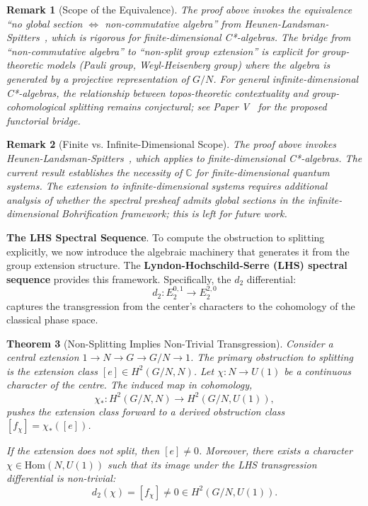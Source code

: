 \documentclass[11pt]{article}
\newtheorem{theorem}{Theorem}[section]
\newtheorem{remark}[theorem]{Remark}
\begin{document}
\begin{remark}[Scope of the Equivalence]
The proof above invokes the equivalence ``no global section $\Leftrightarrow$ non-commutative algebra'' from Heunen-Landsman-Spitters~\cite[Theorem 5.3]{Heunen2012}, which is rigorous for finite-dimensional C*-algebras. The bridge from ``non-commutative algebra'' to ``non-split group extension'' is explicit for group-theoretic models (Pauli group, Weyl-Heisenberg group) where the algebra is generated by a projective representation of $G/N$. For general infinite-dimensional C*-algebras, the relationship between topos-theoretic contextuality and group-cohomological splitting remains conjectural; see Paper V~\cite{PaperV} for the proposed functorial bridge.
\end{remark}

\begin{remark}[Finite vs. Infinite-Dimensional Scope]
The proof above invokes Heunen-Landsman-Spitters~\cite[Theorem 5.3]{Heunen2012}, which applies to finite-dimensional C*-algebras. The current result establishes the necessity of $\mathbb{C}$ for finite-dimensional quantum systems. The extension to infinite-dimensional systems requires additional analysis of whether the spectral presheaf admits global sections in the infinite-dimensional Bohrification framework; this is left for future work.
\end{remark}

\textbf{The LHS Spectral Sequence}.
To compute the obstruction to splitting explicitly, we now introduce the algebraic machinery that generates it from the group extension structure. The \textbf{Lyndon-Hochschild-Serre (LHS) spectral sequence} provides this framework. Specifically, the $d_2$ differential:
\[
d_2: E_2^{0,1} \longrightarrow E_2^{2,0}
\]
captures the transgression from the center's characters to the cohomology of the classical phase space.

\begin{theorem}[Non-Splitting Implies Non-Trivial Transgression]
\label{thm:non-splitting}
Consider a central extension $1 \to N \to G \to G/N \to 1$. The primary obstruction to splitting is the extension class $[e] \in H^2(G/N, N)$. Let $\chi: N \to U(1)$ be a continuous character of the centre. The induced map in cohomology,
\[
\chi_*: H^2(G/N, N) \longrightarrow H^2(G/N, U(1)),
\]
pushes the extension class forward to a derived obstruction class $[f_\chi] = \chi_*([e])$.

If the extension does not split, then $[e] \neq 0$. Moreover, there exists a character $\chi \in \mathrm{Hom}(N, U(1))$ such that its image under the LHS transgression differential is non-trivial:
\[
d_2(\chi) = [f_\chi] \neq 0 \in H^2(G/N, U(1)).
\]
\end{theorem}
\end{document}
